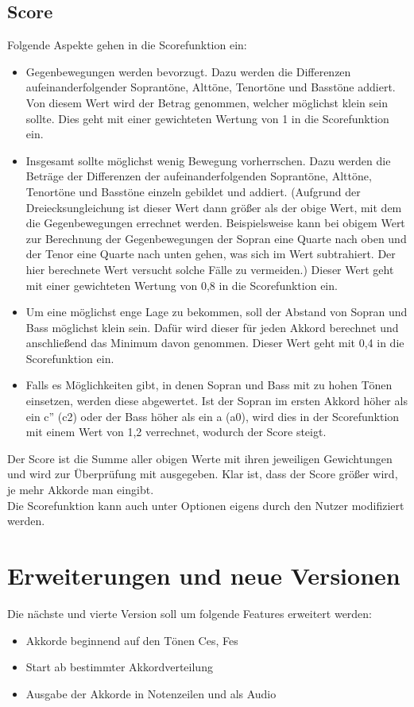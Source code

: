 \documentclass[11.5pt,a4paper]{article}
\begin{document}
\subsection{Score} \label{RegelnScore}
Folgende Aspekte gehen in die Scorefunktion ein: 
\begin{itemize}
	\item Gegenbewegungen werden bevorzugt. Dazu werden die Differenzen aufeinanderfolgender Soprantöne, Alttöne, Tenortöne und Basstöne addiert. Von diesem Wert wird der Betrag genommen, welcher möglichst klein sein sollte. Dies geht mit einer gewichteten Wertung von 1 in die Scorefunktion ein.
	\item Insgesamt sollte möglichst wenig Bewegung vorherrschen. Dazu werden die Beträge der Differenzen der aufeinanderfolgenden Soprantöne, Alttöne, Tenortöne und Basstöne einzeln gebildet und addiert. (Aufgrund der Dreiecksungleichung ist dieser Wert dann größer als der obige Wert, mit dem die Gegenbewegungen errechnet werden. Beispielsweise kann bei obigem Wert zur Berechnung der Gegenbewegungen der Sopran eine Quarte nach oben und der Tenor eine Quarte nach unten gehen, was sich im Wert subtrahiert. Der hier berechnete Wert versucht solche Fälle zu vermeiden.) Dieser Wert geht mit einer gewichteten Wertung von 0,8 in die Scorefunktion ein.
	\item Um eine möglichst enge Lage zu bekommen, soll der Abstand von Sopran und Bass möglichst klein sein. Dafür wird dieser für jeden Akkord berechnet und anschließend das Minimum davon genommen. Dieser Wert geht mit 0,4 in die Scorefunktion ein. 
	\item Falls es Möglichkeiten gibt, in denen Sopran und Bass mit zu hohen Tönen einsetzen, werden diese abgewertet. Ist der Sopran im ersten Akkord höher als ein c'' (c2) oder der Bass höher als ein a (a0), wird dies in der Scorefunktion mit einem Wert von 1,2 verrechnet, wodurch der Score steigt. 
\end{itemize}
Der Score ist die Summe aller obigen Werte mit ihren jeweiligen Gewichtungen und wird zur Überprüfung mit ausgegeben. Klar ist, dass der Score größer wird, je mehr Akkorde man eingibt.  \\
Die Scorefunktion kann auch unter \grqq Optionen \glqq eigens durch den Nutzer modifiziert werden.

\section{Erweiterungen und neue Versionen}
Die nächste und vierte Version soll um folgende Features erweitert werden: 
\begin{itemize}
\item Akkorde beginnend auf den Tönen Ces, Fes
\item Start ab bestimmter Akkordverteilung
\item Ausgabe der Akkorde in Notenzeilen und als Audio
\end{itemize}
\end{document}
